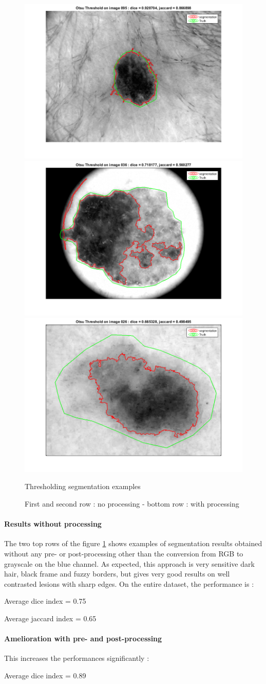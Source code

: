 \documentclass[a4paper,10pt]{article}
\begin{document}
\begin{figure}[h]
	\includegraphics[width=0.32\linewidth]{../results/otsu/otsu-095}
	\includegraphics[width=0.32\linewidth]{../results/otsu/otsu-036}
	\includegraphics[width=0.32\linewidth]{../results/otsu/otsu-026}
	\caption{Thresholding segmentation examples}
	\caption*{First and second row : no processing - bottom row : with processing}
	\label{fig:otsu-ex}
\end{figure}

\paragraph{Results without processing} 
The two top rows of the figure \ref{fig:otsu-ex} shows examples of segmentation results obtained without any pre- or post-processing other than the conversion from RGB to grayscale on the blue channel. As expected, this approach is very sensitive dark hair, black frame and fuzzy borders, but gives very good results on well contrasted lesions with sharp edges. On the entire dataset, the performance is :

Average dice index = 0.75

Average jaccard index = 0.65



\paragraph{Amelioration with pre- and post-processing} This increases the performances significantly :

Average dice index = 0.89
\end{document}
